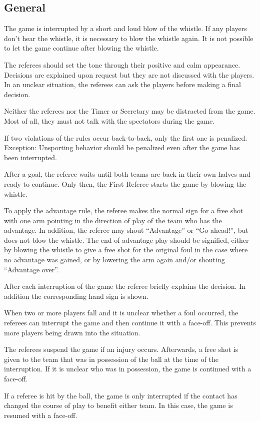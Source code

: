 \subsection{General}
The game is interrupted by a short and loud blow of the whistle.
If any players don't hear the whistle, it is necessary to blow the whistle again.
It is not possible to let the game continue after blowing the whistle.

The referees should set the tone through their positive and calm appearance.
Decisions are explained upon request but they are not discussed with the players.
In an unclear situation, the referees can ask the players before making a final decision.

Neither the referees nor the Timer or Secretary may be distracted from the game.
Most of all, they must not talk with the spectators during the game.

If two violations of the rules occur back-to-back, only the first one is penalized.
Exception: Unsporting behavior should be penalized even after the game has been interrupted.

After a goal, the referee waits until both teams are back in their own halves and ready to continue.
Only then, the First Referee starts the game by blowing the whistle.

To apply the advantage rule, the referee makes the normal sign for a free shot with one arm pointing in the direction of play of the team who has the advantage.
In addition, the referee may shout ``Advantage'' or ``Go ahead!'', but does not blow the whistle.
The end of advantage play should be signified, either by blowing the whistle to give a free shot for the original foul in the case where no advantage was gained, or by lowering the arm again and/or shouting ``Advantage over''.

After each interruption of the game the referee briefly explains the decision.
In addition the corresponding hand sign is shown.

When two or more players fall and it is unclear whether a foul occurred, the referees can interrupt the game and then continue it with a face-off.
This prevents more players being drawn into the situation.

The referees suspend the game if an injury occurs.
Afterwards, a free shot is given to the team that was in possession of the ball at the time of the interruption.
If it is unclear who was in possession, the game is continued with a face-off.

If a referee is hit by the ball, the game is only interrupted if the contact has changed the course of play to benefit either team.
In this case, the game is resumed with a face-off.

